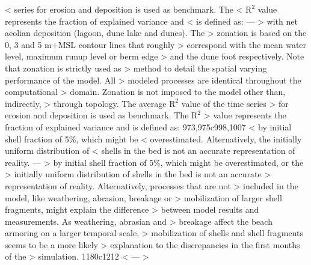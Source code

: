 < series for erosion and deposition is used as benchmark. The
< $\mathrm{R^2}$ value represents the fraction of explained variance and
< is defined as:
---
> with net aeolian deposition (lagoon, dune lake and dunes). The
> zonation is based on the 0, 3 and 5 m+MSL contour lines that roughly
> correspond with the mean water level, maximum runup level or berm edge
> and the dune foot respectively. Note that zonation is strictly used as
> method to detail the spatial varying performance of the model. All
> modeled processes are identical throughout the computational
> domain. Zonation is not imposed to the model other than, indirectly,
> through topology. The average $\mathrm{R^2}$ value of the time series
> for erosion and deposition is used as benchmark. The $\mathrm{R^2}$
> value represents the fraction of explained variance and is defined as:
973,975c998,1007
< by initial shell fraction of 5\%, which might be
< overestimated. Alternatively, the initially uniform distribution of
< shells in the bed is not an accurate representation of reality.
---
> by initial shell fraction of 5\%, which might be overestimated, or the
> initially uniform distribution of shells in the bed is not an accurate
> representation of reality. Alternatively, processes that are not
> included in the model, like weathering, abrasion, breakage or
> mobilization of larger shell fragments, might explain the difference
> between model results and measurements. As weathering, abrasian and
> breakage affect the beach armoring on a larger temporal scale,
> mobilization of shells and shell fragments seems to be a more likely
> explanation to the discrepancies in the first months of the
> simulation.
1180c1212
< %
---
> %
